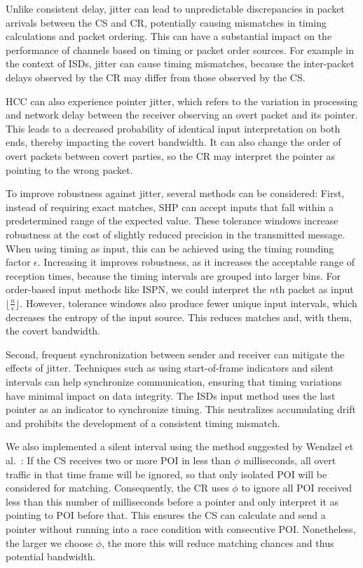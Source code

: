 \documentclass[journal]{IEEEtran}
\begin{document}
Unlike consistent delay, jitter can lead to unpredictable discrepancies in packet arrivals between the \ac{CS} and \ac{CR}, potentially causing mismatches in timing calculations and packet ordering. This can have a substantial impact on the performance of channels based on timing or packet order sources. For example in the context of \ac{ISD}s, jitter can cause timing mismatches, because the inter-packet delays observed by the \ac{CR} may differ from those observed by the \ac{CS}. 

\ac{HCC} can also experience pointer jitter, which refers to the variation in processing and network delay between the receiver observing an overt packet and its pointer. This leads to a decreased probability of identical input interpretation on both ends, thereby impacting the covert bandwidth. It can also change the order of overt packets between covert parties, so the \ac{CR} may interpret the pointer as pointing to the wrong packet.

To improve robustness against jitter, several methods can be considered: First, instead of requiring exact matches, \ac{SHP} can accept inputs that fall within a predetermined range of the expected value. These tolerance windows increase robustness at the cost of slightly reduced precision in the transmitted message. When using timing as input, this can be achieved using the timing rounding factor $\epsilon$. Increasing it improves robustness, as it increases the acceptable range of reception times, because the timing intervals are grouped into larger bins. For order-based input methods like \ac{ISPN}, we could interpret the $n$th packet as input $\lfloor \frac{n}{\epsilon} \rfloor$. However, tolerance windows also produce fewer unique input intervals, which decreases the entropy of the input source. This reduces matches and, with them, the covert bandwidth.

Second, frequent synchronization between sender and receiver can mitigate the effects of jitter. Techniques such as using start-of-frame indicators and silent intervals can help synchronize communication, ensuring that timing variations have minimal impact on data integrity. The \ac{ISD}s input method uses the last pointer as an indicator to synchronize timing. This neutralizes accumulating drift and prohibits the development of a consistent timing mismatch. 

We also implemented a silent interval using the method suggested by Wendzel et al.~\cite{DYST22}: If the \ac{CS} receives two or more \ac{POI} in less than $\phi$ milliseconds, all overt traffic in that time frame will be ignored, so that only isolated \ac{POI} will be considered for matching. Consequently, the \ac{CR} uses $\phi$ to ignore all \ac{POI} received less than this number of milliseconds before a pointer and only interpret it as pointing to \ac{POI} before that. This ensures the \ac{CS} can calculate and send a pointer without running into a race condition with consecutive \ac{POI}. Nonetheless, the larger we choose $\phi$, the more this will reduce matching chances and thus potential bandwidth. 
\end{document}
